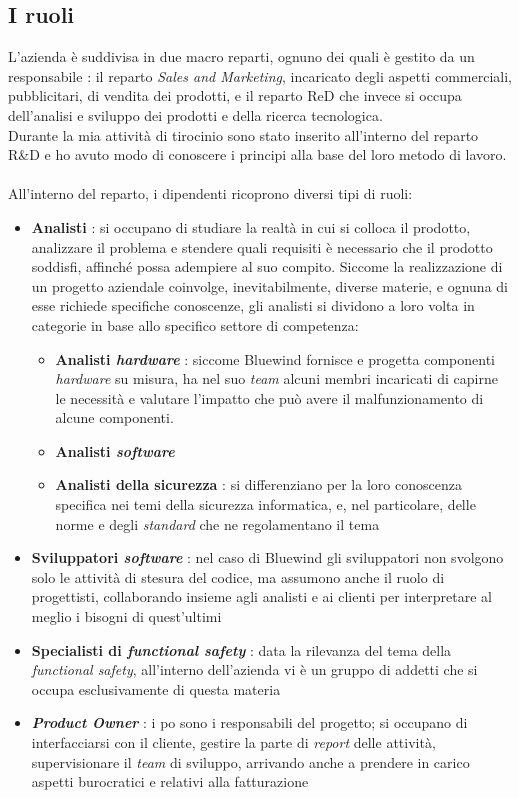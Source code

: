 \subsection{I ruoli}
\noindent
L'azienda è suddivisa in due macro reparti, ognuno dei quali è gestito da un responsabile : il reparto \textit{Sales and Marketing}, incaricato degli aspetti commerciali, pubblicitari, di vendita dei prodotti, e il reparto \gls{ReD} che invece si occupa dell'analisi e sviluppo dei prodotti e della ricerca tecnologica.\\
Durante la mia attività di tirocinio sono stato inserito all'interno del reparto R\&D e ho avuto modo di conoscere i principi alla base del loro metodo di lavoro.\\\\
\noindent
All'interno del reparto, i dipendenti ricoprono diversi tipi di ruoli:
\begin{itemize}
	\itemsep0em
	\item \textbf{Analisti} : si occupano di studiare la realtà in cui si colloca il prodotto, analizzare il problema e stendere quali requisiti è necessario che il prodotto soddisfi, affinché possa adempiere al suo compito.
	Siccome la realizzazione di un progetto aziendale coinvolge, inevitabilmente, diverse materie, e ognuna di esse richiede specifiche conoscenze, gli analisti si dividono a loro volta in categorie in base allo specifico settore di competenza:
	\begin{itemize}
	    \itemsep0em
			\item \textbf{Analisti \textit{hardware}} : siccome Bluewind fornisce e progetta componenti \textit{hardware} su misura, ha nel suo \textit{team} alcuni membri incaricati di capirne le necessità e valutare l'impatto che può avere il malfunzionamento di alcune componenti.
			\item \textbf{Analisti \textit{software}}
			\item \textbf{Analisti della sicurezza} : si differenziano per la loro conoscenza specifica nei temi della sicurezza informatica, e, nel particolare, delle norme e degli \textit{standard} che ne regolamentano il tema
	\end{itemize}
	\item \textbf{Sviluppatori \textit{software}} : nel caso di Bluewind gli sviluppatori non svolgono solo le attività di stesura del codice, ma assumono anche il ruolo di progettisti, collaborando insieme agli analisti e ai clienti per interpretare al meglio i bisogni di quest'ultimi
	\item \textbf{Specialisti di \textit{functional safety}} : data la rilevanza del tema della \textit{functional safety}, all'interno dell'azienda vi è un gruppo di addetti che si occupa esclusivamente di questa materia
	\item \textbf{\textit{Product Owner}} : i \gls{po} sono i responsabili del progetto; si occupano di interfacciarsi con il cliente, gestire la parte di \textit{report} delle attività, supervisionare il \textit{team} di sviluppo, arrivando anche a prendere in carico aspetti burocratici e relativi alla fatturazione
	\end{itemize}

